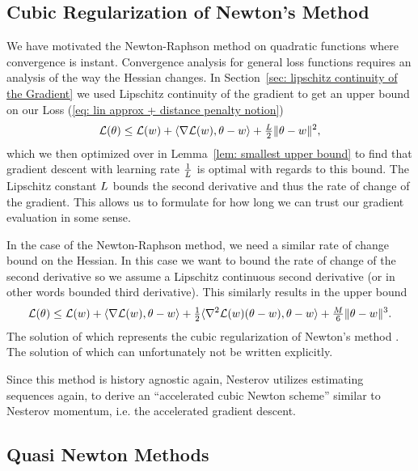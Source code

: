 \subsection{Cubic Regularization of Newton's Method}

We have motivated the Newton-Raphson method on quadratic functions where
convergence is instant. Convergence analysis for general loss functions requires
an analysis of the way the Hessian changes. In Section~\ref{sec:
lipschitz continuity of the Gradient} we used Lipschitz continuity of the
gradient to get an upper bound on our Loss (\ref{eq: lin approx + distance
penalty notion})
\begin{align*}
	\mathcal{L}(\theta)
	\le \mathcal{L}(w) + \langle \nabla\mathcal{L}(w), \theta-w \rangle
	+ \tfrac{L}2 \|\theta-w\|^2,
\end{align*}
which we then optimized over in Lemma~\ref{lem: smallest upper bound} to find
that gradient descent with learning rate \(\tfrac1{L}\) is optimal with
regards to this bound. The Lipschitz constant \(L\) bounds the second
derivative and thus the rate of change of the gradient. This allows us to
formulate for how long we can trust our gradient evaluation in some sense.

In the case of the Newton-Raphson method, we need a similar rate of change
bound on the Hessian. In this case we want to bound the rate of change of the
second derivative so we assume a Lipschitz continuous second derivative (or 
in other words bounded third derivative). This similarly results in the upper
bound
\begin{align*}
	\mathcal{L}(\theta)
	\le \mathcal{L}(w) + \langle \nabla\mathcal{L}(w), \theta-w \rangle
	+ \tfrac12\langle \nabla^2\mathcal{L}(w)(\theta-w), \theta-w \rangle
	+ \tfrac{M}6\|\theta-w\|^3.
\end{align*}
The solution of which represents the cubic regularization of Newton's method
\parencite[Section 4.1]{nesterovLecturesConvexOptimization2018}.
The solution of which can unfortunately not be written explicitly.

Since this method is history agnostic again, Nesterov utilizes estimating sequences
again, to derive an ``accelerated cubic Newton scheme'' \parencite[Section
4.2]{nesterovLecturesConvexOptimization2018} similar to Nesterov momentum, i.e.
the accelerated gradient descent.

\subsection{Quasi Newton Methods}

